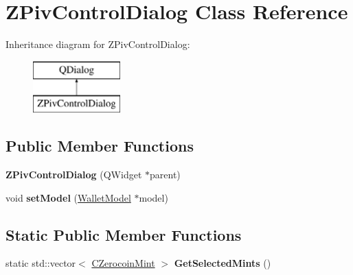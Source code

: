 \hypertarget{class_z_piv_control_dialog}{}\section{Z\+Piv\+Control\+Dialog Class Reference}
\label{class_z_piv_control_dialog}
Inheritance diagram for Z\+Piv\+Control\+Dialog\+:\begin{figure}[H]
\begin{center}
\leavevmode
\includegraphics[height=2.000000cm]{class_z_piv_control_dialog}
\end{center}
\end{figure}
\subsection*{Public Member Functions}
\begin{DoxyCompactItemize}
\item 
\mbox{\label{class_z_piv_control_dialog_adfba76652d296cbce12572d179639b0e}} 
{\bfseries Z\+Piv\+Control\+Dialog} (Q\+Widget $\ast$parent)
\item 
\mbox{\label{class_z_piv_control_dialog_abcf07269a5af87d4ff977ff17017ad38}} 
void {\bfseries set\+Model} (\mbox{\hyperlink{class_wallet_model}{Wallet\+Model}} $\ast$model)
\end{DoxyCompactItemize}
\subsection*{Static Public Member Functions}
\begin{DoxyCompactItemize}
\item 
\mbox{\label{class_z_piv_control_dialog_af05b56c4db62c382330d5f0e215d83d3}} 
static std\+::vector$<$ \mbox{\hyperlink{class_c_zerocoin_mint}{C\+Zerocoin\+Mint}} $>$ {\bfseries Get\+Selected\+Mints} ()
\end{DoxyCompactItemize}
